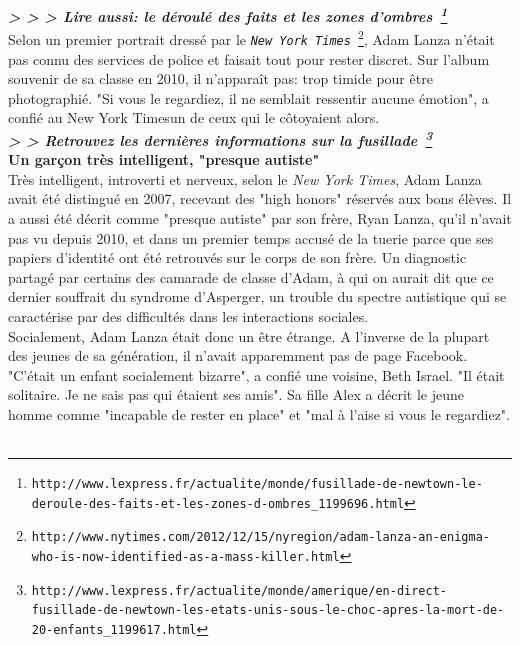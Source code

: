 \documentclass[11pt,twoside,a4paper]{article}
\begin{document}
\textbf{\emph{> > > Lire aussi: le d{\'e}roul{\'e} des faits et les zones d'ombres~\footnote{\texttt{http://www.lexpress.fr/actualite/monde/fusillade-de-newtown-le-deroule-des-faits-et-les-zones-d-ombres\_1199696.html}}}} ~\\

Selon un premier portrait dress{\'e} par le \texttt{\emph{New York Times}~\footnote{\texttt{http://www.nytimes.com/2012/12/15/nyregion/adam-lanza-an-enigma-who-is-now-identified-as-a-mass-killer.html}}}, Adam Lanza n'{\'e}tait pas connu des services de police et faisait tout pour rester discret. Sur l'album souvenir de sa classe en 2010, il n'appara{\^i}t pas: trop timide pour {\^e}tre photographi{\'e}. "Si vous le regardiez, il ne semblait ressentir aucune {\'e}motion", a confi{\'e} au New York Timesun de ceux qui le c{\^o}toyaient alors. ~\\  

\textbf{\emph{> > Retrouvez les derni{\`e}res informations sur la fusillade~\footnote{\texttt{http://www.lexpress.fr/actualite/monde/amerique/en-direct-fusillade-de-newtown-les-etats-unis-sous-le-choc-apres-la-mort-de-20-enfants\_1199617.html}}}} ~\\

\textbf{Un gar\c{c}on tr{\`e}s intelligent, "presque autiste"}~\\

Tr{\`e}s intelligent, introverti et nerveux, selon le \emph{New York Times}, Adam Lanza avait {\'e}t{\'e} distingu{\'e} en 2007, recevant des "high honors" r{\'e}serv{\'e}s aux bons {\'e}l{\`e}ves. Il a aussi {\'e}t{\'e} d{\'e}crit comme "presque autiste" par son fr{\`e}re, Ryan Lanza, qu'il n'avait pas vu depuis 2010, et dans un premier temps accus{\'e} de la tuerie parce que ses papiers d'identit{\'e} ont {\'e}t{\'e} retrouv{\'e}s sur le corps de son fr{\`e}re. Un diagnostic partag{\'e} par certains des camarade de classe d'Adam, {\`a} qui on aurait dit que ce dernier souffrait du syndrome d'Asperger, un trouble du spectre autistique qui se caract{\'e}rise par des difficult{\'e}s dans les interactions sociales. ~\\ 

Socialement, Adam Lanza {\'e}tait donc un {\^e}tre {\'e}trange. A l'inverse de la plupart des jeunes de sa g{\'e}n{\'e}ration, il n'avait apparemment pas de page Facebook. "C'{\'e}tait un enfant socialement bizarre", a confi{\'e} une voisine, Beth Israel. "Il {\'e}tait solitaire. Je ne sais pas qui {\'e}taient ses amis". Sa fille Alex a d{\'e}crit le jeune homme comme "incapable de rester en place" et "mal {\`a} l'aise si vous le regardiez".  ~\\
\end{document}
